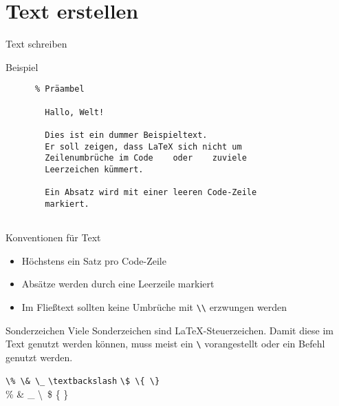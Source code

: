 \section{Text erstellen}

\begin{frame}[fragile]{Text schreiben}
  \begin{block}{Beispiel}
    \begin{lstlisting}
      % Präambel
      
        Hallo, Welt!

        Dies ist ein dummer Beispieltext.
        Er soll zeigen, dass LaTeX sich nicht um
        Zeilenumbrüche im Code    oder    zuviele
        Leerzeichen kümmert.

        Ein Absatz wird mit einer leeren Code-Zeile
        markiert.
      
    \end{lstlisting}
  \end{block}
\end{frame}

\begin{frame}[fragile]{Konventionen für Text}
  \begin{itemize}
    \item Höchstens ein Satz pro Code-Zeile
    \item Absätze werden durch eine Leerzeile markiert
    \item Im Fließtext sollten keine Umbrüche mit \verb+\\+ erzwungen werden
  \end{itemize}
  \begin{alertblock}{Sonderzeichen}
    Viele Sonderzeichen sind \LaTeX-Steuerzeichen.
    Damit diese im Text genutzt werden können, muss meist ein \verb+\+ vorangestellt oder ein Befehl genutzt werden.
  \end{alertblock}
  \begin{CodeExample}{0.6}
    \verb+\% \& \_+ \lstinline+\textbackslash+ \verb+\$ \{ \}+ \\
  \CodeResult
    \% \& \_ \textbackslash\ \$ \{ \}
  \end{CodeExample}
\end{frame}

